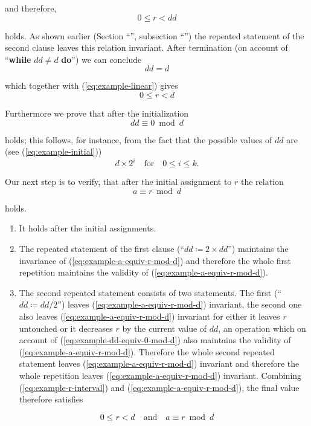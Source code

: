\noindent
and therefore,
\begin{equation}
	\label{eq:example-linear}
	0 \leqslant r <dd
\end{equation}

\noindent
holds. As shown earlier (Section ``'', subsection ``'') the repeated statement of the second clause leaves this relation invariant. After termination (on account of ``\textbf{while} $dd \neq d$ \textbf{do}'') we can
conclude
$$
dd = d
$$

\noindent
which together with (\ref{eq:example-linear}) gives
\begin{equation}
	\label{eq:example-r-interval}
	0 \leqslant r < d
\end{equation}

Furthermore we prove that after the initialization
\begin{equation}
	\label{eq:example-dd-equiv-0-mod-d}
	dd \equiv 0 \bmod d
\end{equation}

\noindent
holds; this follows, for instance, from the fact that the possible values of $dd$ are (see (\ref{eq:example-initial}))
$$
d\times 2^i\quad \text{for}\quad 0 \leqslant i \leqslant k.
$$

Our next step is to verify, that after the initial assignment to $r$ the relation
\begin{equation}
	\label{eq:example-a-equiv-r-mod-d}
	a \equiv r \bmod d
\end{equation}

\noindent
holds.
\begin{enumerate}[label=(\arabic*)]
	\item It holds after the initial assignments.
	\item The repeated statement of the first clause (``$dd \coloneq 2\times dd$'') maintains the invariance of (\ref{eq:example-a-equiv-r-mod-d}) and therefore the whole first repetition maintains the validity of (\ref{eq:example-a-equiv-r-mod-d}). 
	\item The second repeated statement consists of two statements. The first (``$dd \coloneq dd/2$'') leaves (\ref{eq:example-a-equiv-r-mod-d}) invariant, the second one also leaves (\ref{eq:example-a-equiv-r-mod-d}) invariant for either it leaves $r$ untouched or it decreases $r$ by the current value of $dd$, an operation which on account of (\ref{eq:example-dd-equiv-0-mod-d}) also maintains the validity of (\ref{eq:example-a-equiv-r-mod-d}). Therefore the whole second repeated statement leaves (\ref{eq:example-a-equiv-r-mod-d}) invariant and therefore the whole repetition leaves (\ref{eq:example-a-equiv-r-mod-d}) invariant. Combining (\ref{eq:example-r-interval}) and (\ref{eq:example-a-equiv-r-mod-d}), the final value	therefore satisfies
\end{enumerate}
\medskip
$$
0 \leqslant r < d\quad \text{and}\quad a \equiv r \bmod d
$$

